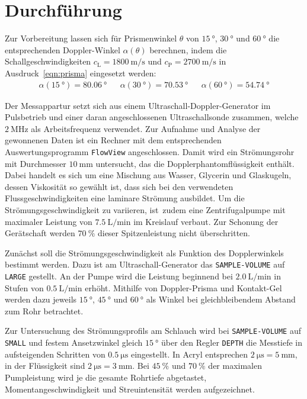 \section{Durchführung}
\label{sec:durchführung}

Zur Vorbereitung lassen sich für Prismenwinkel $\theta$ von $\qty{15}{\degree}$, $\qty{30}{\degree}$ und $\qty{60}{\degree}$ die
entsprechenden Doppler-Winkel $\alpha (\theta)$ berechnen, indem die Schallgeschwindigkeiten $c_\text{L} = \qty{1800}{\meter\per\second}$
und $c_\text{P} = \qty{2700}{\meter\per\second}$ in Ausdruck~\eqref{eqn:prisma} eingesetzt werden:
\begin{align*}
\alpha (\qty{15}{\degree}) = \qty{80.06}{\degree} &&
\alpha (\qty{30}{\degree}) = \qty{70.53}{\degree} &&
\alpha (\qty{60}{\degree}) = \qty{54.74}{\degree}
\end{align*}

Der Messappartur setzt sich aus einem Ultraschall-Doppler-Generator im Pulsbetrieb und einer daran angeschlossenen Ultraschallsonde zusammen,
welche $\qty{2}{\mega\hertz}$ als Arbeitsfrequenz verwendet. Zur Aufnahme und Analyse der gewonnenen Daten ist ein Rechner mit dem
entsprechenden Auswertungsprogramm \verb+FlowView+ angeschlossen. Damit wird ein Strömungsrohr mit Durchmesser $\qty{10}{\milli\meter}$
untersucht, das die Dopplerphantomflüssigkeit enthält. Dabei handelt es sich um eine Mischung aus Wasser, Glycerin und Glaskugeln,
dessen Viskosität so gewählt ist, dass sich bei den verwendeten Flussgeschwindigkeiten eine laminare Strömung ausbildet. Um die
Strömungsgeschwindigkeit zu variieren, \mbox{ist zudem} eine Zentrifugalpumpe mit maximaler Leistung von
$\qty[per-mode=symbol]{7.5}{\liter\per\minute}$ im Kreislauf verbaut. Zur Schonung der Gerätschaft werden $\qty{70}{\percent}$
dieser Spitzenleistung nicht überschritten.

Zunächst soll die Strömungsgeschwindigkeit als Funktion des Dopplerwinkels bestimmt werden. Dazu ist am Ultraschall-Generator
das \verb+SAMPLE-VOLUME+ auf \verb+LARGE+ gestellt. An der Pumpe wird die Leistung beginnend bei $\qty[per-mode=symbol]{2.0}{\liter\per\minute}$
in Stufen von $\qty[per-mode=symbol]{0.5}{\liter\per\minute}$ erhöht. Mithilfe von Doppler-Prisma und Kontakt-Gel werden dazu jeweils
$\qty{15}{\degree}$, $\qty{45}{\degree}$ und $\qty{60}{\degree}$ als Winkel bei gleichbleibendem Abstand zum Rohr betrachtet. 

Zur Untersuchung des Strömungsprofils am Schlauch wird bei \verb+SAMPLE-VOLUME+ auf \verb+SMALL+ und festem Ansetzwinkel gleich $\qty{15}{\degree}$
über den Regler \verb+DEPTH+ die Messtiefe in aufsteigenden Schritten von $\qty{0.5}{\micro\second}$ eingestellt. In Acryl entsprechen
$\qty{2}{\micro\second} = \qty{5}{\milli\meter}$, in der Flüssigkeit sind $\qty{2}{\micro\second} = \qty{3}{\milli\meter}$. Bei $\qty{45}{\percent}$
und $\qty{70}{\percent}$ der maximalen Pumpleistung wird je die gesamte Rohrtiefe abgetastet, Momentangeschwindigkeit und Streuintensität 
werden aufgezeichnet.

